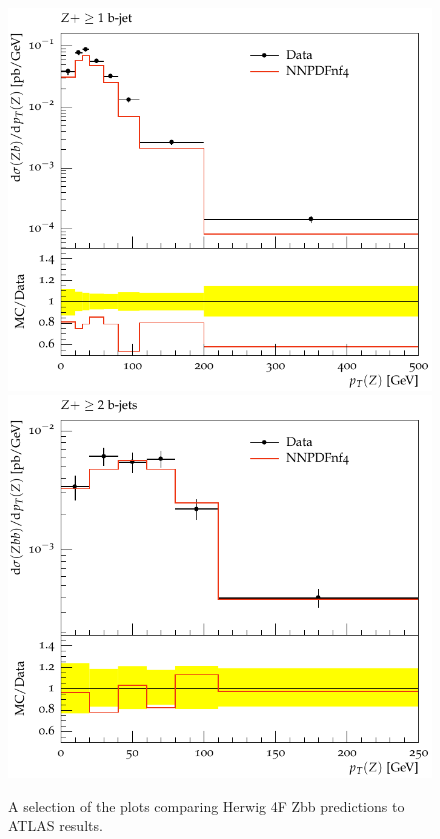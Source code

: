 \documentclass[11pt]{cernrep} \usepackage{graphicx,epsfig} 
\begin{document}
\begin{figure}[htbp]
\begin{center}
   \includegraphics[scale=0.65]{figs/zbb/herwig4F/d15-x01-y01.pdf} 
   \includegraphics[scale=0.65]{figs/zbb/herwig4F/d25-x01-y01.pdf} 
\caption{A selection of the plots comparing Herwig 4F Zbb predictions to ATLAS results.}
\label{zbb-herwig4F-atlas}
\end{center}
\end{figure}
\end{document}
